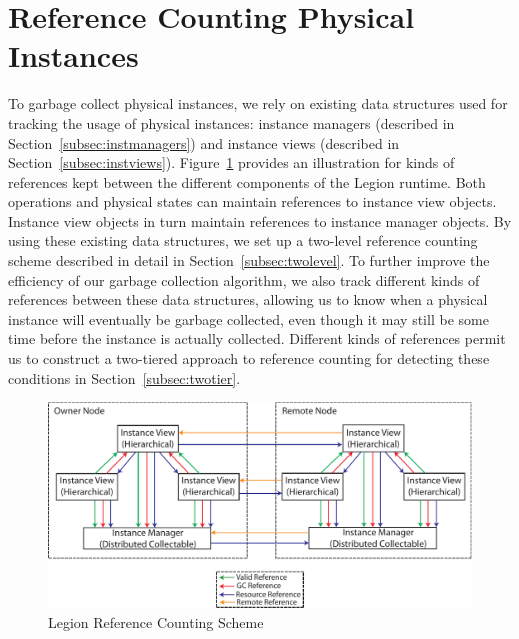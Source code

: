 \section{Reference Counting Physical Instances}
\label{sec:counting}
To garbage collect physical instances, we rely
on existing data structures used for tracking
the usage of physical instances: instance managers
(described in Section~\ref{subsec:instmanagers})
and instance views (described in
Section~\ref{subsec:instviews}). Figure~\ref{fig:multigc}
provides an illustration for kinds of references kept
between the different components of the Legion runtime.
Both operations and physical states can maintain 
references to instance view objects. Instance view 
objects in turn maintain references to instance
manager objects. By using these existing data 
structures, we set up a two-level
reference counting scheme described in detail in
Section~\ref{subsec:twolevel}.
To further improve the efficiency
of our garbage collection algorithm, we also
track different kinds of references between
these data structures, allowing us to know
when a physical instance will eventually be
garbage collected, even though it may still be
some time before the instance is actually 
collected.  Different kinds of references permit
us to construct a two-tiered approach to reference 
counting for detecting these conditions in 
Section~\ref{subsec:twotier}.

\begin{figure}
\centering
\includegraphics[scale=0.7]{figs/MultiNodeReference.pdf}
\caption{Legion Reference Counting Scheme\label{fig:multigc}}
\end{figure}

